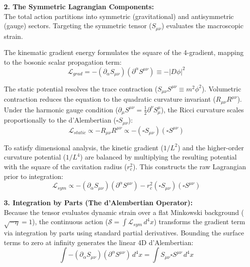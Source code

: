 \textbf{2. The Symmetric Lagrangian Components:} \\
The total action partitions into symmetric (gravitational) and antisymmetric (gauge) sectors. Targeting the symmetric tensor ($S_{\mu\nu}$) evaluates the macroscopic strain.

The kinematic gradient energy formulates the square of the 4-gradient, mapping to the bosonic scalar propagation term:
\begin{equation}
    \mathcal{L}_{grad} = -(\partial_\alpha S_{\mu\nu})(\partial^\alpha S^{\mu\nu}) \equiv -|D\phi|^2
\end{equation}

The static potential resolves the trace contraction ($S_{\mu\nu}S^{\mu\nu} \equiv m^2\phi^2$). Volumetric contraction reduces the equation to the quadratic curvature invariant ($R_{\mu\nu}R^{\mu\nu}$). Under the harmonic gauge condition ($\partial_\mu S^{\mu\nu} = \frac{1}{2}\partial^\nu S^\mu_\mu$), the Ricci curvature scales proportionally to the d'Alembertian ($\square S_{\mu\nu}$): 
\begin{equation}
    \mathcal{L}_{static} \propto - R_{\mu\nu}R^{\mu\nu} \propto - (\square S_{\mu\nu})(\square S^{\mu\nu})
\end{equation}

To satisfy dimensional analysis, the kinetic gradient ($1/L^2$) and the higher-order curvature potential ($1/L^4$) are balanced by multiplying the resulting potential with the square of the cavitation radius ($r_c^2$). This constructs the raw Lagrangian prior to integration: 
\begin{equation}
    \mathcal{L}_{sym} \propto -(\partial_\alpha S_{\mu\nu})(\partial^\alpha S^{\mu\nu}) - r_c^2 (\square S_{\mu\nu})(\square S^{\mu\nu})
\end{equation}

\textbf{3. Integration by Parts (The d'Alembertian Operator):} \\
Because the tensor evaluates dynamic strain over a flat Minkowski background ($\sqrt{-\eta} = 1$), the continuous action ($\mathcal{S} = \int \mathcal{L}_{sym} \, d^4x$) transforms the gradient term via integration by parts using standard partial derivatives. Bounding the surface terms to zero at infinity generates the linear 4D d'Alembertian:
\begin{equation}
    \int -(\partial_\alpha S_{\mu\nu})(\partial^\alpha S^{\mu\nu}) \, d^4x = \int S_{\mu\nu} \square S^{\mu\nu} \, d^4x 
\end{equation}

